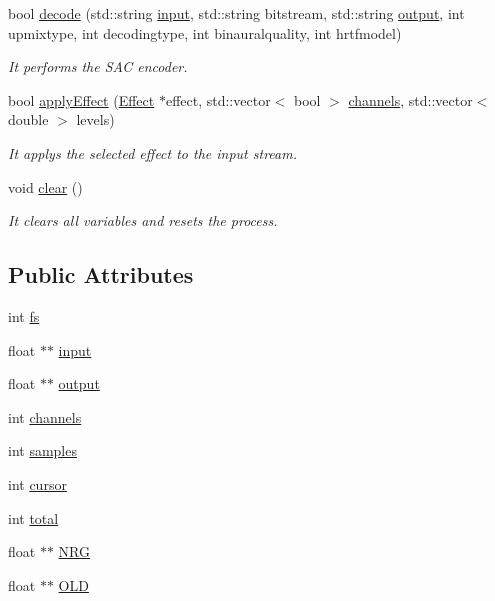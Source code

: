 \begin{DoxyCompactItemize}
bool \hyperlink{class_process_manager_ad882d23c995a27ac064826412b5127a8}{decode} (std\+::string \hyperlink{class_process_manager_aafb2937f6a2f261b1581917ba872ba9b}{input}, std\+::string bitstream, std\+::string \hyperlink{class_process_manager_a135c866f06b0042c2835cd9ecefa05f3}{output}, int upmixtype, int decodingtype, int binauralquality, int hrtfmodel)
\begin{DoxyCompactList}\small\item\em It performs the S\+AC encoder. \end{DoxyCompactList}\item 
bool \hyperlink{class_process_manager_a91a8718847e535f297756fa8604dc8f4}{apply\+Effect} (\hyperlink{class_effect}{Effect} $\ast$effect, std\+::vector$<$ bool $>$ \hyperlink{class_process_manager_a325109138cabf342e5beacf7af67480b}{channels}, std\+::vector$<$ double $>$ levels)
\begin{DoxyCompactList}\small\item\em It applys the selected effect to the input stream. \end{DoxyCompactList}\item 
\mbox{\label{class_process_manager_a9c807d64f58ca890b9b4acde3f1c1bb2}} 
void \hyperlink{class_process_manager_a9c807d64f58ca890b9b4acde3f1c1bb2}{clear} ()
\begin{DoxyCompactList}\small\item\em It clears all variables and resets the process. \end{DoxyCompactList}\end{DoxyCompactItemize}
\subsection*{Public Attributes}
\begin{DoxyCompactItemize}
\item 
int \hyperlink{class_process_manager_ae7ce9ead957c4f78d74206baf1837a59}{fs}
\item 
float $\ast$$\ast$ \hyperlink{class_process_manager_aafb2937f6a2f261b1581917ba872ba9b}{input}
\item 
float $\ast$$\ast$ \hyperlink{class_process_manager_a135c866f06b0042c2835cd9ecefa05f3}{output}
\item 
int \hyperlink{class_process_manager_a325109138cabf342e5beacf7af67480b}{channels}
\item 
int \hyperlink{class_process_manager_aac9c5dea3ac0ed72df1f6f780c62010a}{samples}
\item 
int \hyperlink{class_process_manager_a337af1b32b2f6bf94ed98ef98e6d1226}{cursor}
\item 
int \hyperlink{class_process_manager_abcf97b9835a8dfb0d55e37069663cda9}{total}
\item 
float $\ast$$\ast$ \hyperlink{class_process_manager_a70a556eaff879d870603033a9ffcbc5b}{N\+RG}
\item 
float $\ast$$\ast$ \hyperlink{class_process_manager_a3c015ada1a03ef508a542f9b2f6a8ff3}{O\+LD}
\end{DoxyCompactItemize}


